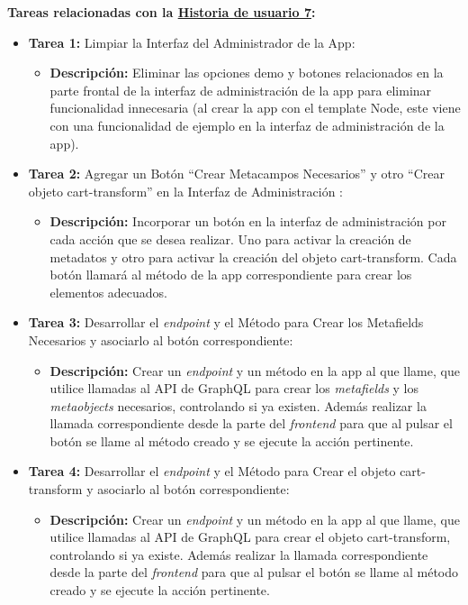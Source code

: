 \documentclass[12pt]{article}
\begin{document}
\textbf{Tareas relacionadas con la \hyperref[sec:historia7]{Historia de usuario 7}:}
\begin{itemize}
    \item \textbf{Tarea 1:} Limpiar la Interfaz del Administrador de la App:
          \begin{itemize}[label=--]
              \item \textbf{Descripción:} Eliminar las opciones demo y botones relacionados en la parte frontal de la interfaz de administración de la app para eliminar funcionalidad innecesaria (al crear la app con el template Node, este viene con una funcionalidad de ejemplo en la interfaz de administración de la app).
          \end{itemize}
    \item \textbf{Tarea 2:} Agregar un Botón ``Crear Metacampos Necesarios'' y otro ``Crear objeto cart-transform'' en la Interfaz de Administración :
          \begin{itemize}[label=--]
              \item \textbf{Descripción:} Incorporar un botón en la interfaz de administración por cada acción que se desea realizar. Uno para activar la creación de metadatos y otro para activar la creación del objeto cart-transform. Cada botón llamará al método de la app correspondiente para crear los elementos adecuados.
          \end{itemize}
    \item \textbf{Tarea 3:} Desarrollar el \textit{endpoint} y el Método para Crear los Metafields Necesarios y asociarlo al botón correspondiente:
          \begin{itemize}[label=--]
              \item \textbf{Descripción:} Crear un \textit{endpoint} y un método en la app al que llame, que utilice llamadas al API de GraphQL para crear los \textit{metafields} y los \textit{metaobjects} necesarios, controlando si ya existen. Además realizar la llamada correspondiente desde la parte del \textit{frontend} para que al pulsar el botón se llame al método creado y se ejecute la acción pertinente.
          \end{itemize}
    \item \textbf{Tarea 4:} Desarrollar el \textit{endpoint} y el Método para Crear el objeto cart-transform y asociarlo al botón correspondiente:
          \begin{itemize}[label=--]
              \item \textbf{Descripción:} Crear un \textit{endpoint} y un método en la app al que llame, que utilice llamadas al API de GraphQL para crear el objeto cart-transform, controlando si ya existe. Además realizar la llamada correspondiente desde la parte del \textit{frontend} para que al pulsar el botón se llame al método creado y se ejecute la acción pertinente.

\end{itemize}
\end{itemize}
\end{document}
